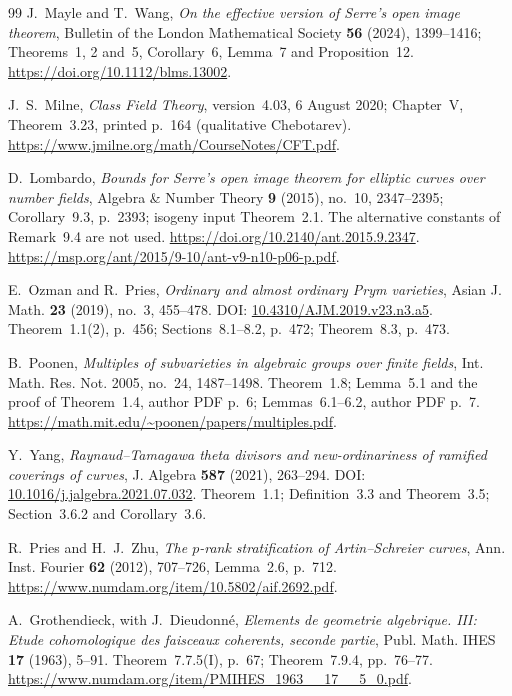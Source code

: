 \documentclass[11pt,a4paper]{article}
\begin{document}
\begin{thebibliography}{99}
J.~Mayle and T.~Wang, \emph{On the effective version of Serre's
open image theorem}, Bulletin of the London Mathematical Society
\textbf{56} (2024), 1399--1416; Theorems~1, 2 and~5,
Corollary~6, Lemma~7 and Proposition~12.
\url{https://doi.org/10.1112/blms.13002}.

J.~S.~Milne, \emph{Class Field Theory}, version~4.03,
6 August 2020; Chapter~V, Theorem~3.23, printed p.~164
(qualitative Chebotarev).
\url{https://www.jmilne.org/math/CourseNotes/CFT.pdf}.

D.~Lombardo, \emph{Bounds for Serre's open image theorem for elliptic
curves over number fields}, Algebra \& Number Theory \textbf{9}
(2015), no.~10, 2347--2395; Corollary~9.3, p.~2393;
isogeny input Theorem~2.1. The alternative constants of Remark~9.4
are not used.
\url{https://doi.org/10.2140/ant.2015.9.2347}.
\url{https://msp.org/ant/2015/9-10/ant-v9-n10-p06-p.pdf}.

E.~Ozman and R.~Pries,
\emph{Ordinary and almost ordinary Prym varieties},
Asian J. Math. \textbf{23} (2019), no.~3, 455--478.
DOI: \href{https://doi.org/10.4310/AJM.2019.v23.n3.a5}{10.4310/AJM.2019.v23.n3.a5}.
Theorem~1.1(2), p.~456; Sections~8.1--8.2, p.~472;
Theorem~8.3, p.~473.

B.~Poonen,
\emph{Multiples of subvarieties in algebraic groups over finite fields},
Int. Math. Res. Not. 2005, no.~24, 1487--1498.
Theorem~1.8; Lemma~5.1 and the proof of Theorem~1.4, author PDF p.~6;
Lemmas~6.1--6.2, author PDF p.~7.
\url{https://math.mit.edu/~poonen/papers/multiples.pdf}.

Y.~Yang,
\emph{Raynaud--Tamagawa theta divisors and new-ordinariness of
ramified coverings of curves},
J. Algebra \textbf{587} (2021), 263--294.
DOI: \href{https://doi.org/10.1016/j.jalgebra.2021.07.032}{10.1016/j.jalgebra.2021.07.032}.
Theorem~1.1; Definition~3.3 and Theorem~3.5;
Section~3.6.2 and Corollary~3.6.

R.~Pries and H.~J.~Zhu, \emph{The $p$-rank stratification of
Artin--Schreier curves}, Ann. Inst. Fourier \textbf{62} (2012),
707--726, Lemma~2.6, p.~712.
\url{https://www.numdam.org/item/10.5802/aif.2692.pdf}.

A.~Grothendieck, with J.~Dieudonn\'e, \emph{Elements de geometrie
algebrique. III: Etude cohomologique des faisceaux coherents,
seconde partie}, Publ. Math. IHES \textbf{17} (1963), 5--91.
Theorem~7.7.5(I), p.~67; Theorem~7.9.4, pp.~76--77.
\url{https://www.numdam.org/item/PMIHES_1963__17__5_0.pdf}.


\end{thebibliography}
\end{document}
